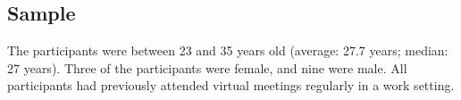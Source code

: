 \subsection{Sample}

The participants were between 23 and 35 years old (average: 27.7 years; median: 27 years). Three of the
participants were female, and nine were male. All participants had previously attended virtual meetings
regularly in a work setting.
